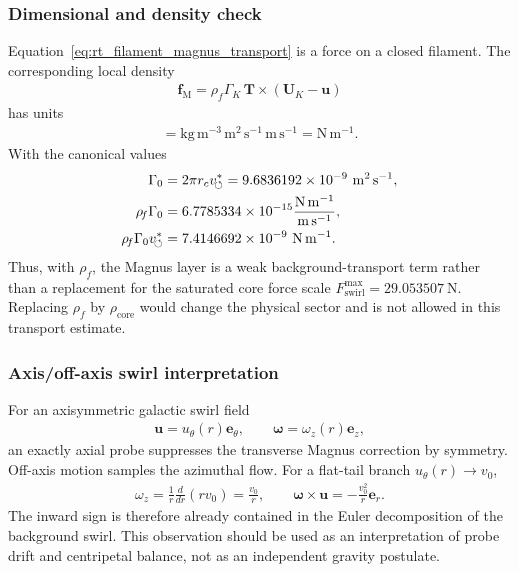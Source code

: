 \subsubsection{Dimensional and density check}
    Equation~\eqref{eq:rt_filament_magnus_transport} is a force on a closed
    filament. The corresponding local density
    \begin{align}
        \mathbf{f}_{\mathrm{M}}
        =
        \rho_{\!f}\Gamma_K\,
        \mathbf{T}\times(\mathbf{U}_K-\mathbf{u})
    \end{align}
    has units
    \begin{align}
        [\rho_{\!f}\Gamma_K\Delta U]
        =
        \mathrm{kg\,m^{-3}}\,\mathrm{m^2\,s^{-1}}\,\mathrm{m\,s^{-1}}
        =
        \mathrm{N\,m^{-1}}.
    \end{align}
    With the canonical values
    \begin{align}
        \Gamma_0
        &=
        2\pi r_cv_{\!\boldsymbol{\circlearrowleft}}^{\ast}
        =
        9.6836192\times10^{-9}\ \mathrm{m^2\,s^{-1}},\\
        \rho_{\!f}\Gamma_0
        &=
        6.7785334\times10^{-15}
        \frac{\mathrm{N\,m^{-1}}}{\mathrm{m\,s^{-1}}},\\
        \rho_{\!f}\Gamma_0v_{\!\boldsymbol{\circlearrowleft}}^{\ast}
        &=
        7.4146692\times10^{-9}\ \mathrm{N\,m^{-1}}.
    \end{align}
    Thus, with \(\rho_{\!f}\), the Magnus layer is a weak background-transport
    term rather than a replacement for the saturated core force scale
    \(F_{\mathrm{swirl}}^{\max}=29.053507\ \mathrm{N}\). Replacing
    \(\rho_{\!f}\) by \(\rho_{\mathrm{core}}\) would change the physical sector and
    is not allowed in this transport estimate.

\subsubsection{Axis/off-axis swirl interpretation}
    For an axisymmetric galactic swirl field
    \begin{align}
        \mathbf{u}=u_\theta(r)\mathbf{e}_\theta,
        \qquad
        \boldsymbol{\omega}=\omega_z(r)\mathbf{e}_z,
    \end{align}
    an exactly axial probe suppresses the transverse Magnus correction by symmetry.
    Off-axis motion samples the azimuthal flow. For a flat-tail branch
    \(u_\theta(r)\to v_0\),
    \begin{align}
        \omega_z
        =
        \frac{1}{r}\frac{d}{dr}\left(r v_0\right)
        =
        \frac{v_0}{r},
        \qquad
        \boldsymbol{\omega}\times\mathbf{u}
        =
        -\frac{v_0^2}{r}\mathbf{e}_r.
    \end{align}
    The inward sign is therefore already contained in the Euler decomposition of
    the background swirl. This observation should be used as an interpretation of
    probe drift and centripetal balance, not as an independent gravity postulate.

